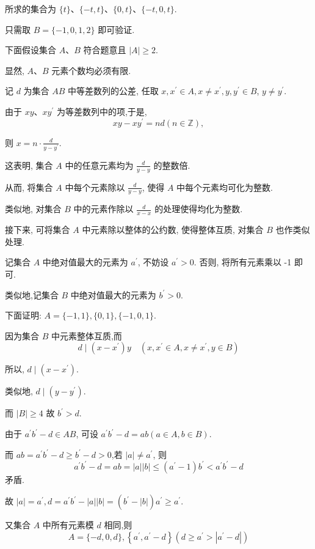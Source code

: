 \begin{solution}
	所求的集合为 $\{t\} 、\{-t, t\} 、\{0, t\} 、\{-t, 0, t\}$.

	只需取 $B=\{-1,0,1,2\}$ 即可验证.

	下面假设集合 $A 、 B$ 符合题意且 $|A| \geqslant 2$.

	显然, $A 、 B$ 元素个数均必须有限.

	记 $d$ 为集合 $A B$ 中等差数列的公差, 任取 $x, x^{\prime} \in A, x \neq x^{\prime}, y, y^{\prime} \in B$, $y \neq y^{\prime}$.

	由于 $x y 、 x y^{\prime}$ 为等差数列中的项,于是,
	$$
		x y-x y^{\prime}=n d(n \in \mathbb{Z}),
	$$

	则 $x=n \cdot \frac{d}{y-y^{\prime}}$.

	这表明, 集合 $A$ 中的任意元素均为 $\frac{d}{y-y}$ 的整数倍.

	从而, 将集合 $A$ 中每个元素除以 $\frac{d}{y-y}$, 使得 $A$ 中每个元素均可化为整数.

	类似地, 对集合 $B$ 中的元素作除以 $\frac{d}{x-x}$ 的处理使得均化为整数.

	接下来, 可将集合 $A$ 中元素除以整体的公约数, 使得整体互质, 对集合 $B$ 也作类似处理.

	记集合 $A$ 中绝对值最大的元素为 $a^{\prime}$, 不妨设 $a^{\prime}>0$. 否则, 将所有元素乘以 -1 即可.

	类似地,记集合 $B$ 中绝对值最大的元素为 $b^{\prime}>0$.

	下面证明: $A=\{-1,1\},\{0,1\},\{-1,0,1\}$.

	因为集合 $B$ 中元素整体互质,而
	$$
		d \mid\left(x-x^{\prime}\right) y \quad\left(x, x^{\prime} \in A, x \neq x^{\prime}, y \in B\right)
	$$

	所以, $d \mid\left(x-x^{\prime}\right)$.

	类似地, $d \mid\left(y-y^{\prime}\right)$.

	而 $|B| \geqslant 4$ 故 $b^{\prime}>d$.

	由于 $a^{\prime} b^{\prime}-d \in A B$, 可设 $a^{\prime} b^{\prime}-d=a b(a \in A, b \in B)$.

	而 $a b=a^{\prime} b^{\prime}-d \geqslant b^{\prime}-d>0$,若 $|a| \neq a^{\prime}$, 则
	$$
		a^{\prime} b^{\prime}-d=a b=|a||b| \leqslant\left(a^{\prime}-1\right) b^{\prime}<a^{\prime} b^{\prime}-d
	$$
	矛盾.

	故 $|a|=a^{\prime}, d=a^{\prime} b^{\prime}-|a||b|=\left(b^{\prime}-|b|\right) a^{\prime} \geqslant a^{\prime}$.

	又集合 $A$ 中所有元素模 $d$ 相同,则
	$$
		A=\{-d, 0, d\},\left\{a^{\prime}, a^{\prime}-d\right\}\left(d \geqslant a^{\prime}>\left|a^{\prime}-d\right|\right)
	$$


\end{solution}
